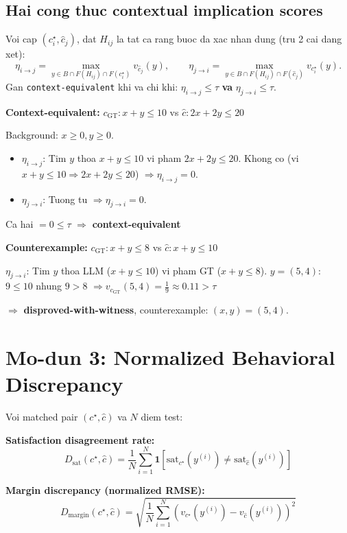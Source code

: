 \documentclass[11pt,a4paper]{article}
\begin{document}
\subsection{Hai cong thuc contextual implication scores}

\begin{keyformula}
Voi cap $(c_i^\star, \hat{c}_j)$, dat $H_{ij}$ la tat ca rang buoc da xac nhan dung (tru 2 cai dang xet):
\[
\eta_{i \to j} = \max_{y \in B \cap F(H_{ij}) \cap F(c_i^\star)} v_{\hat{c}_j}(y),
\qquad
\eta_{j \to i} = \max_{y \in B \cap F(H_{ij}) \cap F(\hat{c}_j)} v_{c_i^\star}(y).
\]
Gan \texttt{context-equivalent} khi va chi khi:
$\eta_{i \to j} \leq \tau$ \textbf{va} $\eta_{j \to i} \leq \tau$.
\end{keyformula}

\begin{example}
\textbf{Context-equivalent:} $c_{\mathrm{GT}}: x + y \leq 10$ vs $\hat{c}: 2x + 2y \leq 20$

Background: $x \geq 0, y \geq 0$.
\begin{itemize}
  \item $\eta_{i\to j}$: Tim $y$ thoa $x+y\leq10$ vi pham $2x+2y\leq20$.
    Khong co (vi $x+y\leq10 \Rightarrow 2x+2y\leq20$) $\Rightarrow \eta_{i\to j}=0$.
  \item $\eta_{j\to i}$: Tuong tu $\Rightarrow \eta_{j\to i}=0$.
\end{itemize}
Ca hai $=0\leq\tau$ $\Rightarrow$ \textbf{context-equivalent} \checkmark
\end{example}

\begin{example}
\textbf{Counterexample:} $c_{\mathrm{GT}}: x+y\leq8$ vs $\hat{c}: x+y\leq10$

$\eta_{j\to i}$: Tim $y$ thoa LLM ($x+y\leq10$) vi pham GT ($x+y\leq8$).
$y=(5,4)$: $9\leq10$ \checkmark nhung $9>8$
$\Rightarrow v_{c_\mathrm{GT}}(5,4)=\frac{1}{9}\approx0.11>\tau$

$\Rightarrow$ \textbf{disproved-with-witness}, counterexample: $(x,y)=(5,4)$.
\end{example}

\section{Mo-dun 3: Normalized Behavioral Discrepancy}

\begin{keyformula}
Voi matched pair $(c^\star, \hat{c})$ va $N$ diem test:

\textbf{Satisfaction disagreement rate:}
\[
D_{\mathrm{sat}}(c^\star, \hat{c}) =
\frac{1}{N}\sum_{i=1}^{N}
\mathbf{1}\!\left[\mathrm{sat}_{c^\star}(y^{(i)}) \neq \mathrm{sat}_{\hat{c}}(y^{(i)})\right]
\]

\textbf{Margin discrepancy (normalized RMSE):}
\[
D_{\mathrm{margin}}(c^\star, \hat{c}) =
\sqrt{\frac{1}{N}\sum_{i=1}^{N}
\left(v_{c^\star}(y^{(i)}) - v_{\hat{c}}(y^{(i)})\right)^2}
\]
\end{keyformula}
\end{document}

